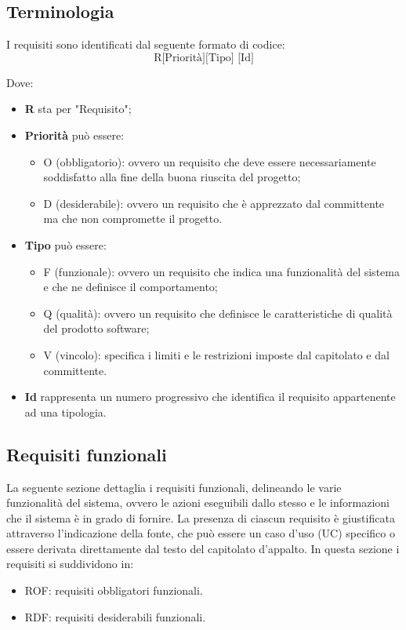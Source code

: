\documentclass[12pt, oneside]{article}
\begin{document}
\subsection{Terminologia}
I requisiti sono identificati dal seguente formato di codice:
\[
\text{R[Priorità][Tipo] [Id]}
\]

Dove:
\begin{itemize}
    \item \textbf{R} sta per "Requisito";
    \item \textbf{Priorità} può essere:
    \begin{itemize}
        \item O (obbligatorio): ovvero un requisito che deve essere necessariamente soddisfatto alla fine della buona riuscita del progetto;
        \item D (desiderabile): ovvero un requisito che è apprezzato dal committente ma che non compromette il progetto.
    \end{itemize}
    \item \textbf{Tipo} può essere:
    \begin{itemize}
        \item F (funzionale): ovvero un requisito che indica una funzionalità del sistema e che ne definisce il comportamento;
        \item Q (qualità): ovvero un requisito che definisce le caratteristiche di qualità del prodotto software;
        \item V (vincolo): specifica i limiti e le restrizioni imposte dal capitolato e dal committente.
    \end{itemize}
    \item \textbf{Id} rappresenta un numero progressivo che identifica il requisito appartenente ad una tipologia.
\end{itemize}
\newpage
\subsection{Requisiti funzionali}
La seguente sezione dettaglia i requisiti funzionali, delineando le varie funzionalità del sistema, ovvero le azioni eseguibili dallo stesso e le informazioni che il sistema è in grado di fornire. La presenza di ciascun requisito è giustificata attraverso l'indicazione della fonte, che può essere un caso d'uso (UC) specifico o essere derivata direttamente dal testo del capitolato d'appalto.
In questa sezione i requisiti si suddividono in:
\begin{itemize}
    \item ROF: requisiti obbligatori funzionali.
    \item RDF: requisiti desiderabili funzionali.
\end{itemize}
\end{document}
